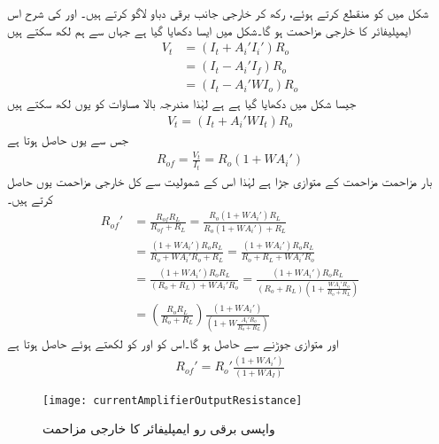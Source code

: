 شکل  میں  کو منقطع کرتے ہوئے،  رکھ  کر خارجی جانب برقی دباو  لاگو کرتے ہیں۔ اور  کی شرح اس ایمپلیفائر کا خارجی مزاحمت  ہو گا۔شکل  میں ایسا دکھایا گیا ہے جہاں سے ہم لکھ سکتے ہیں
\begin{align*}
V_t&=\left(I_t+A_i' I_i' \right ) R_o \\
&=\left(I_t-A_i' I_f \right ) R_o \\
&=\left(I_t-A_i' W I_o \right ) R_o 
\end{align*}
جیسا شکل میں دکھایا گیا ہے   ہے لہٰذا مندرجہ بالا مساوات کو یوں لکھ سکتے ہیں
\begin{align*}
V_t=\left (I_t +A_i' W I_t\right ) R_o
\end{align*}
جس سے  یوں حاصل ہوتا ہے
\begin{align}
R_{of}=\frac{V_t}{I_t}=R_o \left (1+W A_i' \right )
\end{align}
بار مزاحمت  مزاحمت  کے متوازی جڑا ہے لہٰذا اس کے شمولیت سے کل خارجی مزاحمت   یوں حاصل کرتے ہیں۔
\begin{align*}
R_{of}'&=\frac{R_{of} R_L}{R_{of}+R_L}=\frac{R_o \left (1+W A_i'\right ) R_L}{R_o \left (1+W A_i'\right )+R_L}\\
&=\frac{\left (1+W A_i'\right )R_o R_L}{R_o+W A_i' R_o+R_L}=\frac{\left (1+W A_i'\right )R_o R_L}{R_o+R_L+W A_i' R_o}\\
&=\frac{\left (1+W A_i'\right )R_o R_L}{\left (R_o+R_L\right)+W A_i' R_o}=\frac{\left (1+W A_i'\right )R_o R_L}{\left (R_o+R_L\right) \left (1+ \frac{W A_i' R_o}{R_o+R_L}\right )} \\
&=\left(\frac{R_o R_L}{R_o+R_L} \right) \frac{\left (1+W A_i' \right )}{\left (1+W \frac{A_i' R_o}{R_o+R_L} \right )}
\end{align*}
  اور  متوازی جوڑنے سے   حاصل ہو گا۔اس کو   اور   کو  لکھتے ہوئے حاصل ہوتا ہے
\begin{align} 
R_{of}'=R_o' \frac{\left (1+W A_i'\right )}{\left (1+ W A_I\right )}
\end{align}
%
\begin{figure}
\centering
\texttt{[image: currentAmplifierOutputResistance]}
\caption{واپسی برقی رو ایمپلیفائر کا خارجی مزاحمت}
\label{شکل_واپسی_برقی_رو_ایمپلیفائر_خارجی_مزاحمت}
\end{figure}


